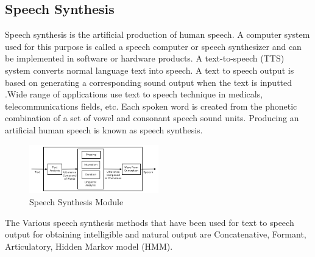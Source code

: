 \documentclass[conference]{IEEEtran}
\begin{document}
\subsection{\textbf{Speech Synthesis}}
Speech synthesis is the artificial production of human speech. A computer system used for this purpose is called a speech computer or speech synthesizer and can be implemented in software or hardware products. A text-to-speech (TTS) system converts normal language text into speech. A text to speech output is based on generating a corresponding sound output when the text is inputted \cite{b11}.Wide range of applications use text to speech technique in medicals, telecommunications fields, etc. Each spoken word is created from the phonetic combination of a set of vowel and consonant speech sound units. Producing an artificial human speech is known as speech synthesis.  
\begin{figure}[!ht]
	\centering
	\includegraphics[width=0.5\textwidth]{SpSy.png}
	\caption{Speech Synthesis Module\cite{b12}}
\end{figure}
The Various speech synthesis methods that have been used for text to speech output for obtaining intelligible and natural output are Concatenative, Formant, Articulatory, Hidden Markov model (HMM)\cite{b13}. 
\end{document}
